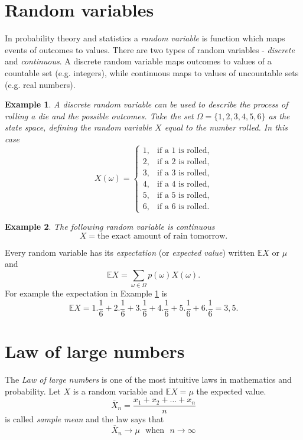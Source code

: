 \documentclass[12pt, a4paper,leqno]{report}
\theoremstyle{normal}
\theoremstyle{normal}
\newtheorem{example}{Example}[chapter]
\def\expect{\mathbb{E}}
\begin{document}
	\section{Random variables}
	In probability theory and statistics a \textit{random variable} is function which maps events of outcomes to values.
	There are two types of random variables - \textit{discrete} and \textit{continuous}. A discrete random variable maps outcomes to values of a countable set (e.g. integers), while continuous maps to values of uncountable sets (e.g. real numbers).
	
	\begin{example}
		\label{ex:die_x}
		A discrete random variable can be used to describe the process of rolling a die and the possible outcomes. Take the set $\Omega = \lbrace 1, 2, 3, 4, 5, 6\rbrace$ as the state space, defining the random variable $X$ equal to the number rolled.
		In this case
		\[ X(\omega) = \begin{cases}
			1, & \text{if a 1 is rolled} ,\\
			2, & \text{if a 2 is rolled} ,\\
			3, & \text{if a 3 is rolled} ,\\
			4, & \text{if a 4 is rolled} ,\\
			5, & \text{if a 5 is rolled} ,\\
			6, & \text{if a 6 is rolled} .
		\end{cases} \]
	\end{example}
	
	\begin{example}
		The following random variable is continuous
		\[ X = \text{the exact amount of rain tomorrow}. \]
	\end{example}
	
	\noindent Every random variable has its \textit{expectation} (or \textit{expected value}) written $\expect X$ or $\mu$ and
	\[ \expect X = \sum\limits_{\omega\in \Omega} p(\omega) X(\omega). \]
	For example the expectation in Example \ref{ex:die_x} is
	\[ \expect X = 1.\frac{1}{6} + 2.\frac{1}{6} + 3.\frac{1}{6} + 4.\frac{1}{6} + 5.\frac{1}{6} + 6.\frac{1}{6} = 3,5 . \]	
	
	\section{Law of large numbers}
	The \textit{Law of large numbers} is one of the most intuitive laws in mathematics and probability.
	Let $X$ is a random variable and $\expect X = \mu$ the expected value.
	\[ \overline{X}_n = \frac{x_1 + x_2 + \dots + x_n}{n} \]
	is called \textit{sample mean} and the law says that
	\[ \overline{X}_n \to \mu \ \ \ \text{when} \ \ \ n\to\infty \]
	
\end{document}
